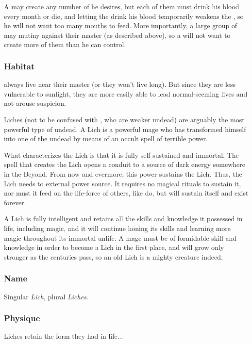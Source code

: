 A \Reaver{} may create any number of \Leeches{} he desires, but each of them must drink his blood every month or die, and letting the \Leech{} drink his blood temporarily weakens the \Reaver, so he will not want too many mouths to feed. More importantly, a large group of \Leeches{} may mutiny against their master (as described above), so a \Reaver{} will not want to create more of them than he can control. 

\subsubsection{Habitat}
\Leeches{} always live near their \Reaver{} master (or they won't live long). But since they are less vulnerable to sunlight, they are more easily able to lead normal-seeming lives and not arouse suspicion. 



Liches (not to be confused with \Leeches, who are weaker undead) are arguably the most powerful type of undead. A Lich is a powerful mage who has transformed himself into one of the undead by means of an occult spell of terrible power. 

What characterizes the Lich is that it is fully self-sustained and immortal. The spell that creates the Lich opens a conduit to a source of dark energy somewhere in the Beyond. From now and evermore, this power sustains the Lich. Thus, the Lich needs to external power source. It requires no magical rituals to sustain it, nor must it feed on the life-force of others, like \Reavers{} do, but will sustain itself and exist forever.

A Lich is fully intelligent and retains all the skills and knowledge it possessed in life, including magic, and it will continue honing its skills and learning more magic throughout its immortal unlife. A mage must be of formidable skill and knowledge in order to become a Lich in the first place, and will grow only stronger as the centuries pass, so an old Lich is a mighty creature indeed. 

\subsubsection{Name}
Singular \emph{Lich}, plural \emph{Liches}. 

\subsubsection{Physique}
Liches retain the form they had in life...

